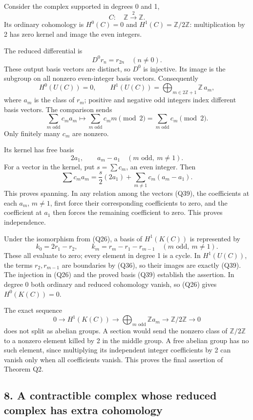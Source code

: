 \documentclass[
]{article}
\begin{document}
Consider the complex supported in degrees 0 and 1, \[
C:\quad\mathbb Z\xrightarrow{\,2\,}\mathbb Z.
\tag{Q35}
\] Its ordinary cohomology is \(H^0(C)=0\) and
\(H^1(C)=\mathbb Z/2\mathbb Z\): multiplication by 2 has zero kernel and
image the even integers.

The reduced differential is \[
D^0r_n=r_{2n}\quad(n\ne0).
\tag{Q36}
\] These output basis vectors are distinct, so \(D^0\) is injective. Its
image is the subgroup on all nonzero even-integer basis vectors.
Consequently \[
H^0(U(C))=0,
\qquad
H^1(U(C))=\bigoplus_{m\in2\mathbb Z+1}\mathbb Z\,a_m,
\tag{Q37}
\] where \(a_m\) is the class of \(r_m\); positive and negative odd
integers index different basis vectors. The comparison sends \[
\sum_{m\text{ odd}}c_m a_m
\longmapsto\sum_{m\text{ odd}}c_m m\pmod2
=\sum_{m\text{ odd}}c_m\pmod2.
\tag{Q38}
\] Only finitely many \(c_m\) are nonzero.

Its kernel has free basis \[
2a_1,\qquad a_m-a_1\quad(m\text{ odd},\ m\ne1).
\tag{Q39}
\] For a vector in the kernel, put \(s=\sum c_m\), an even integer. Then
\[
\sum c_m a_m=\frac{s}{2}(2a_1)
+\sum_{m\ne1}c_m(a_m-a_1).
\] This proves spanning. In any relation among the vectors (Q39), the
coefficients at each \(a_m\), \(m\ne1\), first force their corresponding
coefficients to zero, and the coefficient at \(a_1\) then forces the
remaining coefficient to zero. This proves independence.

Under the isomorphism from (Q26), a basis of \(H^1(K(C))\) is
represented by \[
k_0=2r_1-r_2,
\qquad
k_m=r_m-r_1-r_{m-1}\quad(m\text{ odd},\ m\ne1).
\tag{Q40}
\] These all evaluate to zero; every element in degree 1 is a cycle. In
\(H^1(U(C))\), the terms \(r_2,r_{m-1}\) are boundaries by (Q36), so
their images are exactly (Q39). The injection in (Q26) and the proved
basis (Q39) establish the assertion. In degree 0 both ordinary and
reduced cohomology vanish, so (Q26) gives \(H^0(K(C))=0\).

The exact sequence \[
0\to H^1(K(C))\to
\bigoplus_{m\text{ odd}}\mathbb Z a_m\to\mathbb Z/2\mathbb Z\to0
\tag{Q41}
\] does not split as abelian groups. A section would send the nonzero
class of \(\mathbb Z/2\mathbb Z\) to a nonzero element killed by 2 in
the middle group. A free abelian group has no such element, since
multiplying its independent integer coefficients by 2 can vanish only
when all coefficients vanish. This proves the final assertion of Theorem
Q2.

\subsection{8. A contractible complex whose reduced complex has extra
cohomology}\label{a-contractible-complex-whose-reduced-complex-has-extra-cohomology}
\end{document}
